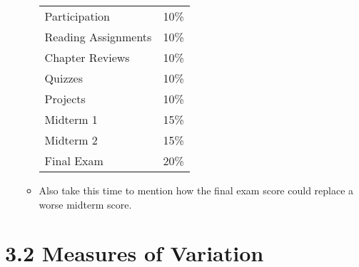 \documentclass{article}
\begin{document}
\begin{enumerate}
\begin{itemize}
            \begin{center}
            \begin{tabular}{ll}
            Participation & 10\% \\
            Reading Assignments & 10\% \\
            Chapter Reviews & 10\% \\
            Quizzes & 10\% \\
            Projects & 10\% \\
            Midterm 1 & 15\% \\
            Midterm 2 & 15\% \\
            Final Exam & 20\% \\
            \end{tabular}
            \end{center}
            
            \item Also take this time to mention how the final exam score could replace a worse midterm score.
            
        \end{itemize}
        
\end{enumerate}
        
        

\section*{3.2  Measures of Variation}
\end{document}
